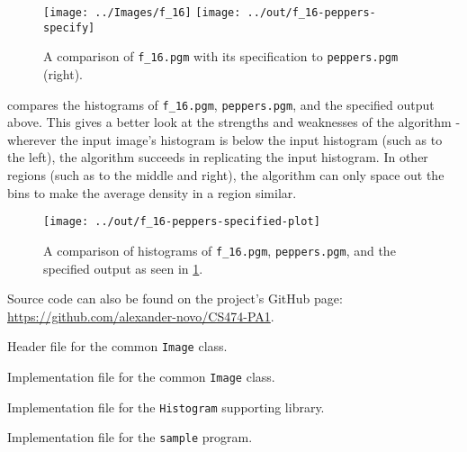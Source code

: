 \documentclass[headings=optiontoheadandtoc,listof=totoc,parskip=full]{scrartcl}
\newenvironment{longlisting}{\captionsetup{type=listing}}{}
\begin{document}
\begin{figure}[H]
	\centering
	\texttt{[image: ../Images/f\_16]}
	\texttt{[image: ../out/f\_16-peppers-specify]}
	\caption{A comparison of \texttt{f\_16.pgm} with its specification to \texttt{peppers.pgm} (right).}
	\label{fig:specify-result-2}
\end{figure}

 compares the histograms of \texttt{f\_16.pgm}, \texttt{peppers.pgm}, and the specified output above. This gives a better look at the strengths and weaknesses of the algorithm - wherever the input image's histogram is below the input histogram (such as to the left), the algorithm succeeds in replicating the input histogram. In other regions (such as to the middle and right), the algorithm can only space out the bins to make the average density in a region similar.

\begin{figure}[H]
	\centering\texttt{[image: ../out/f\_16-peppers-specified-plot]}
	\caption{A comparison of histograms of \texttt{f\_16.pgm}, \texttt{peppers.pgm}, and the specified output as seen in \cref{fig:specify-result-2}.}
	\label{fig:specify-histogram-2}
\end{figure}

\clearpage
\listoflistings

Source code can also be found on the project's GitHub page: \url{https://github.com/alexander-novo/CS474-PA1}.

\begin{longlisting}
	\caption{Header file for the common \texttt{Image} class.}
\end{longlisting}

\begin{longlisting}
	\caption{Implementation file for the common \texttt{Image} class.}
\end{longlisting}

\begin{longlisting}
	\caption{Implementation file for the \texttt{Histogram} supporting library.}
\end{longlisting}

\begin{longlisting}
	\caption{Implementation file for the \texttt{sample} program.}
\end{longlisting}
\end{document}
